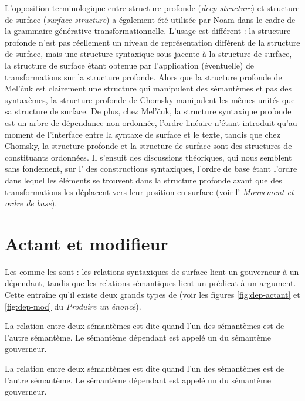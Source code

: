 {L’opposition terminologique entre structure profonde (\textit{deep structure}) et structure de surface (\textit{surface structure}) a également été utilisée par Noam  \citet{chomsky1965aspects} dans le cadre de la grammaire générative-transformationnelle. L’usage est différent : la structure profonde n’est pas réellement un niveau de représentation différent de la structure de surface, mais une structure syntaxique sous-jacente à la structure de surface, la structure de surface étant obtenue par l’application (éventuelle) de transformations sur la structure profonde. Alors que la structure profonde de Mel’čuk est clairement une structure qui manipulent des sémantèmes et pas des syntaxèmes, la structure profonde de Chomsky manipulent les mêmes unités que sa structure de surface. De plus, chez Mel’čuk, la structure syntaxique profonde est un arbre de dépendance non ordonnée, l’ordre linéaire n’étant introduit qu’au moment de l’interface entre la syntaxe de surface et le texte, tandis que chez Chomsky, la structure profonde et la structure de surface sont des structures de constituants ordonnées. Il s’ensuit des discussions théoriques, qui nous semblent sans fondement, sur l’ des constructions syntaxiques, l’ordre de base étant l’ordre dans lequel les éléments se trouvent dans la structure profonde avant que des transformations les déplacent vers leur position en surface (voir l’ \textit{Mouvement et ordre de base}).}

\section{Actant et modifieur}
Les  comme les  sont  : les relations syntaxiques de surface lient un gouverneur à un dépendant, tandis que les relations sémantiques lient un prédicat à un argument. Cette  entraîne qu’il existe deux grands types de  (voir les figures \ref{fig:dep-actant} et \ref{fig:dep-mod} du  \textit{Produire un énoncé}).

{La relation entre deux sémantèmes est dite  quand l’un des sémantèmes est  de l’autre sémantème. Le sémantème dépendant est appelé un  du sémantème gouverneur.}

{La relation entre deux sémantèmes est dite  quand l’un des sémantèmes est  de l’autre sémantème. Le sémantème dépendant est appelé un  du sémantème gouverneur.}

